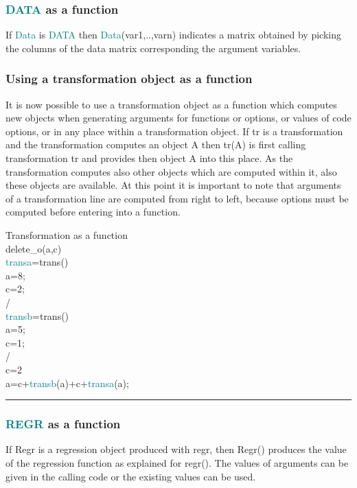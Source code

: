 {\subsubsection{\textcolor{teal}{DATA} as a function} 
\label{datafunc} 
If \textcolor{teal}{Data} is  \textcolor{teal}{DATA} then \textcolor{teal}{Data}(var1,..,varn) indicates a matrix obtained by picking 
the columns of the data matrix corresponding the argument variables. 
\subsubsection{Using a transformation object as a function} 
\label{transfunc} 
It is now possible to use a transformation object as a function which computes new 
objects when generating arguments for functions or options, 
or values of code options, or in any place within a transformation object. 
If {tr} is a transformation and the transformation computes an object {A} then 
{tr(A)} is first calling transformation {tr} and provides then object {A} into this place. 
As the transformation computes also other objects which are computed within it, also these objects 
are available. At this point it is important to note that arguments of 
a transformation line are computed from right to left, because options must be computed before 
entering into a function. 
\singlespacing 
\begin{example}[transfunc]Transformation as a function\\ 
\label{transfunc} 
\noindent \textcolor{VioletRed}{delete\_o}(a,c)\\ 
\textcolor{teal}{transa}=\textcolor{VioletRed}{trans}()\\ 
a=8;\\ 
c=2;\\ 
/   \\ 
\textcolor{teal}{transb}=\textcolor{VioletRed}{trans}()\\ 
a=5;\\ 
c=1;\\ 
/   \\ 
c=2\\ 
a=c+\textcolor{teal}{transb}(a)+c+\textcolor{teal}{transa}(a);\\ 
\end{example} 
\vspace{-7mm} \rule{5cm}{0.1pt} 
\onehalfspacing 
\subsubsection{\textcolor{teal}{REGR} as a function} 
\label{regrfunc} 
If Regr is a regression object produced with regr, then Regr() produces 
the value of the regression function as explained for \textcolor{VioletRed}{regr}(). The values of arguments 
can be given in the calling code or the existing values can be used. 
}
